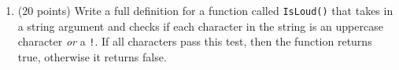 \documentclass[
]{article}
\providecommand{\tightlist}{%
  \setlength{\itemsep}{0pt}\setlength{\parskip}{0pt}}
\begin{document}
\begin{verbatim}
\end{verbatim}

\pagebreak

\begin{enumerate}
\def\labelenumi{\arabic{enumi}.}
\setcounter{enumi}{5}
\tightlist
\item
  (20 points) Write a full definition for a function called
  \texttt{IsLoud()} that takes in a string argument and checks if each
  character in the string is an uppercase character \emph{or} a
  \texttt{\textquotesingle{}!\textquotesingle{}}. If all characters pass
  this test, then the function returns true, otherwise it returns false.
\end{enumerate}

\begin{verbatim}
\end{verbatim}
\end{document}
